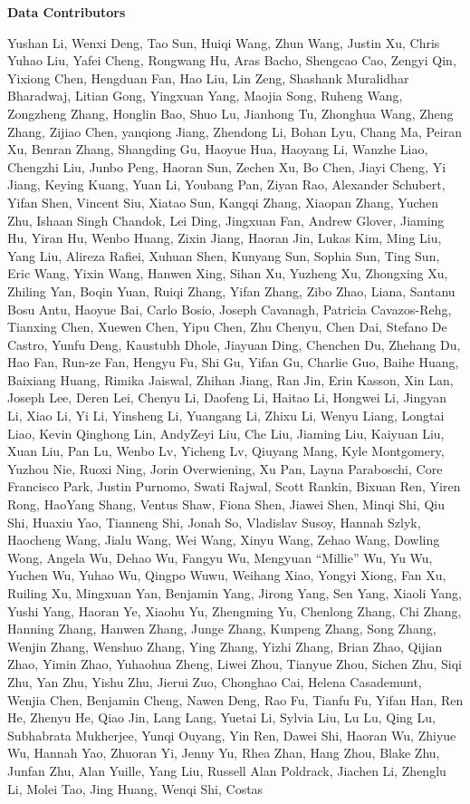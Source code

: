 {\normalsize\bfseries Data Contributors}\par\vspace{4pt}
{\footnotesize
Yushan Li, Wenxi Deng, Tao Sun, Huiqi Wang, Zhun Wang, Justin Xu, Chris Yuhao Liu, Yafei Cheng, Rongwang Hu, Aras Bacho, Shengcao Cao, Zengyi Qin, Yixiong Chen, Hengduan Fan, Hao Liu, Lin Zeng, Shashank Muralidhar Bharadwaj, Litian Gong, Yingxuan Yang, Maojia Song, Ruheng Wang, Zongzheng Zhang, Honglin Bao, Shuo Lu, Jianhong Tu, Zhonghua Wang, Zheng Zhang, Zijiao Chen, yanqiong Jiang, Zhendong Li, Bohan Lyu, Chang Ma, Peiran Xu, Benran Zhang, Shangding Gu, Haoyue Hua, Haoyang Li, Wanzhe Liao, Chengzhi Liu, Junbo Peng, Haoran Sun, Zechen Xu, Bo Chen, Jiayi Cheng, Yi Jiang, Keying Kuang, Yuan Li, Youbang Pan, Ziyan Rao, Alexander Schubert, Yifan Shen, Vincent Siu, Xiatao Sun, Kangqi Zhang, Xiaopan Zhang, Yuchen Zhu, Ishaan Singh Chandok, Lei Ding, Jingxuan Fan, Andrew Glover, Jiaming Hu, Yiran Hu, Wenbo Huang, Zixin Jiang, Haoran Jin, Lukas Kim, Ming Liu, Yang Liu, Alireza Rafiei, Xuhuan Shen, Kunyang Sun, Sophia Sun, Ting Sun, Eric Wang, Yixin Wang, Hanwen Xing, Sihan Xu, Yuzheng Xu, Zhongxing Xu, Zhiling Yan, Boqin Yuan, Ruiqi Zhang, Yifan Zhang, Zibo Zhao, Liana, Santanu Bosu Antu, Haoyue Bai, Carlo Bosio, Joseph Cavanagh, Patricia Cavazos-Rehg, Tianxing Chen, Xuewen Chen, Yipu Chen, Zhu Chenyu, Chen Dai, Stefano De Castro, Yunfu Deng, Kaustubh Dhole, Jiayuan Ding, Chenchen Du, Zhehang Du, Hao Fan, Run-ze Fan, Hengyu Fu, Shi Gu, Yifan Gu, Charlie Guo, Baihe Huang, Baixiang Huang, Rimika Jaiswal, Zhihan Jiang, Ran Jin, Erin Kasson, Xin Lan, Joseph Lee, Deren Lei, Chenyu Li, Daofeng Li, Haitao Li, Hongwei Li, Jingyan Li, Xiao Li, Yi Li, Yinsheng Li, Yuangang Li, Zhixu Li, Wenyu Liang, Longtai Liao, Kevin Qinghong Lin, AndyZeyi Liu, Che Liu, Jiaming Liu, Kaiyuan Liu, Xuan Liu, Pan Lu, Wenbo Lv, Yicheng Lv, Qiuyang Mang, Kyle Montgomery, Yuzhou Nie, Ruoxi Ning, Jorin Overwiening, Xu Pan, Layna Paraboschi, Core Francisco Park, Justin Purnomo, Swati Rajwal, Scott Rankin, Bixuan Ren, Yiren Rong, HaoYang Shang, Ventus Shaw, Fiona Shen, Jiawei Shen, Minqi Shi, Qiu Shi, Huaxiu Yao, Tianneng Shi, Jonah So, Vladislav Susoy, Hannah Szlyk, Haocheng Wang, Jialu Wang, Wei Wang, Xinyu Wang, Zehao Wang, Dowling Wong, Angela Wu, Dehao Wu, Fangyu Wu, Mengyuan ``Millie'' Wu, Yu Wu, Yuchen Wu, Yuhao Wu, Qingpo Wuwu, Weihang Xiao, Yongyi Xiong, Fan Xu, Ruiling Xu, Mingxuan Yan, Benjamin Yang, Jirong Yang, Sen Yang, Xiaoli Yang, Yushi Yang, Haoran Ye, Xiaohu Yu, Zhengming Yu, Chenlong Zhang, Chi Zhang, Hanning Zhang, Hanwen Zhang, Junge Zhang, Kunpeng Zhang, Song Zhang, Wenjin Zhang, Wenshuo Zhang, Ying Zhang, Yizhi Zhang, Brian Zhao, Qijian Zhao, Yimin Zhao, Yuhaohua Zheng, Liwei Zhou, Tianyue Zhou, Sichen Zhu, Siqi Zhu, Yan Zhu, Yishu Zhu, Jierui Zuo, Chonghao Cai, Helena Casademunt, Wenjia Chen, Benjamin Cheng, Nawen Deng, Rao Fu, Tianfu Fu, Yifan Han, Ren He, Zhenyu He, Qiao Jin, Lang Lang, Yuetai Li, Sylvia Liu, Lu Lu, Qing Lu, Subhabrata Mukherjee, Yunqi Ouyang, Yin Ren, Dawei Shi, Haoran Wu, Zhiyue Wu, Hannah Yao, Zhuoran Yi, Jenny Yu, Rhea Zhan, Hang Zhou, Blake Zhu, Junfan Zhu, Alan Yuille, Yang Liu, Russell Alan Poldrack, Jiachen Li, Zhenglu Li, Molei Tao, Jing Huang, Wenqi Shi, Costas }
